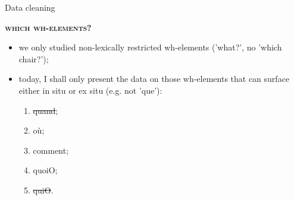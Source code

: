 \documentclass[lesson_slides]{subfiles}
\begin{document}
\begin{frame}[c]{Data cleaning}


    \textbf{\textsc{which wh-elements?}}
    
    \begin{itemize}
        \item[\ding{227}] we only studied non-lexically restricted wh-elements ('what?', no 'which chair?');
        \item[\ding{227}] today, I shall only present the data on those wh-elements that can surface either in situ or ex situ (e.g. not 'que'):
        \begin{enumerate}
            \item {\st{quand}};
            \item où;
            \item comment;
            \item quoiO;
            \item {\st{quiO}}.
        \end{enumerate}
    \end{itemize}
    
\end{frame}
\end{document}
